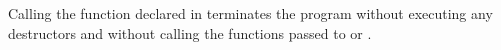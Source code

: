 \pnum
{}%
%
%
Calling the function  declared in
%
 terminates the program without executing any destructors
and without calling
the functions passed to  or .%
